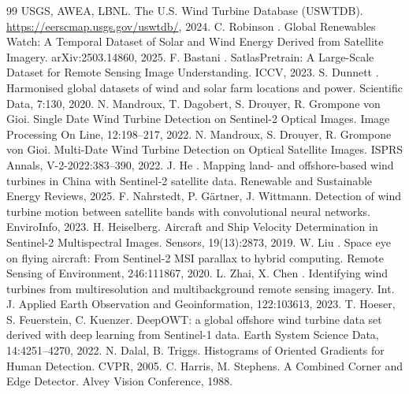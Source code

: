 \documentclass[10pt,twocolumn,letterpaper]{article}
\begin{document}
{\small

\begin{thebibliography}{99}
 USGS, AWEA, LBNL. The U.S. Wind Turbine Database (USWTDB). \url{https://eerscmap.usgs.gov/uswtdb/}, 2024.
 C. Robinson \etal. Global Renewables Watch: A Temporal Dataset of Solar and Wind Energy Derived from Satellite Imagery. arXiv:2503.14860, 2025.
 F. Bastani \etal. SatlasPretrain: A Large-Scale Dataset for Remote Sensing Image Understanding. ICCV, 2023.
 S. Dunnett \etal. Harmonised global datasets of wind and solar farm locations and power. Scientific Data, 7:130, 2020.
 N. Mandroux, T. Dagobert, S. Drouyer, R. Grompone von Gioi. Single Date Wind Turbine Detection on Sentinel-2 Optical Images. Image Processing On Line, 12:198--217, 2022.
 N. Mandroux, S. Drouyer, R. Grompone von Gioi. Multi-Date Wind Turbine Detection on Optical Satellite Images. ISPRS Annals, V-2-2022:383--390, 2022.
 J. He \etal. Mapping land- and offshore-based wind turbines in China with Sentinel-2 satellite data. Renewable and Sustainable Energy Reviews, 2025.
 F. Nahrstedt, P. G\"artner, J. Wittmann. Detection of wind turbine motion between satellite bands with convolutional neural networks. EnviroInfo, 2023.
 H. Heiselberg. Aircraft and Ship Velocity Determination in Sentinel-2 Multispectral Images. Sensors, 19(13):2873, 2019.
 W. Liu \etal. Space eye on flying aircraft: From Sentinel-2 MSI parallax to hybrid computing. Remote Sensing of Environment, 246:111867, 2020.
 L. Zhai, X. Chen \etal. Identifying wind turbines from multiresolution and multibackground remote sensing imagery. Int. J. Applied Earth Observation and Geoinformation, 122:103613, 2023.
 T. Hoeser, S. Feuerstein, C. Kuenzer. DeepOWT: a global offshore wind turbine data set derived with deep learning from Sentinel-1 data. Earth System Science Data, 14:4251--4270, 2022.
 N. Dalal, B. Triggs. Histograms of Oriented Gradients for Human Detection. CVPR, 2005.
 C. Harris, M. Stephens. A Combined Corner and Edge Detector. Alvey Vision Conference, 1988.
\end{thebibliography}
}

\appendix
\end{document}
